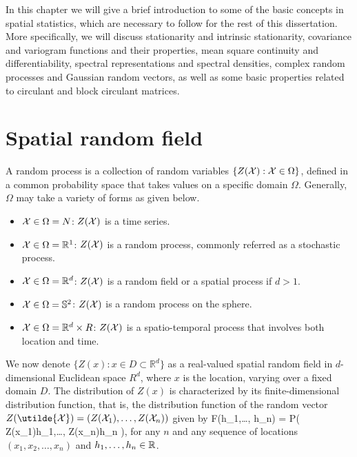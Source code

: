 

% 

% 

In this chapter we will give a brief introduction to some of the basic concepts in spatial statistics, which are necessary to follow for the rest of this dissertation. More specifically, we will discuss stationarity and intrinsic stationarity, covariance and variogram functions and their properties, mean square continuity and differentiability, spectral representations and spectral densities, complex random processes and Gaussian random vectors, as well as some basic properties related to circulant and block circulant matrices.   %


\section{Spatial random field}
A random process is a collection of random variables $\{Z(\mathcal{X}): \mathcal{X} \in \Omega\}$, defined in a common probability space that takes values on a specific domain $\Omega$. Generally, $\Omega$ may take a variety of forms as given below. 

\begin{itemize}
	\item $\mathcal{X} \in \Omega = N$: $Z(\mathcal{X})$ is a time series.
	\item $\mathcal{X} \in \Omega = \mathbb{R}^1$: $Z(\mathcal{X})$ is a random process, commonly referred as a stochastic process.
	\item $\mathcal{X} \in \Omega = \mathbb{R}^d$: $Z(\mathcal{X})$ is a random field or a spatial process if $d > 1$.
	\item $\mathcal{X} \in \Omega = \mathbb{S}^2$: $Z(\mathcal{X})$ is a random process on the sphere.
	\item $\mathcal{X} \in \Omega = \mathbb{R}^d\times R$: $Z(\mathcal{X})$ is a spatio-temporal process that involves both location and time.
\end{itemize}

We now denote $\{Z(x): x \in D \subset \mathbb{R}^d\}$ as a real-valued spatial random field in $d$-dimensional Euclidean space $R^d$, where $x$ is the location, varying over a fixed domain $D$. The distribution of $Z(x)$ is characterized by its finite-dimensional distribution function, that is, the distribution function of the random vector $ Z(\utilde{\X})=(Z(\X_1),\ldots, Z(\X_n) )$ given by
\beq
F(h_1,\ldots, h_n) = P( Z(x_1)\le h_1,\ldots, Z(x_n)\le h_n ),
\eeq
for any $n$ and any sequence of locations $(x_1, x_2, \ldots, x_n)$ and $h_1,\ldots, h_n \in \mathbb{R}$.\\


